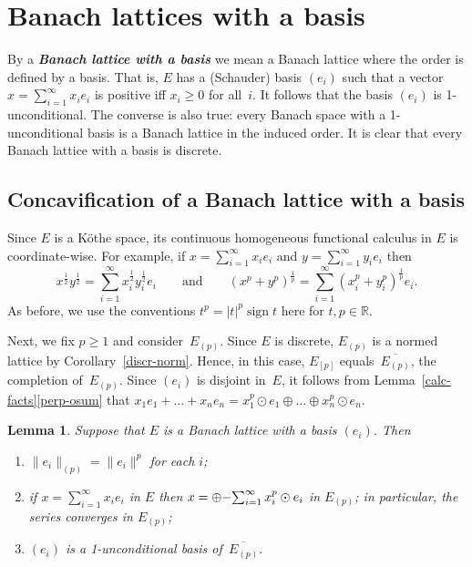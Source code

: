 \documentclass[12pt]{amsart}
\theoremstyle{plain}
\newtheorem{lemma}[theorem]{Lemma}
\theoremstyle{definition}
\newcommand{\abs}[1]{\lvert#1\rvert}
\newcommand{\norm}[1]{\lVert#1\rVert}
\renewcommand{\ge}{\geqslant}
\newcommand{\term}[1]{{\textit{\textbf{#1}}}}
\def\xyroot{x^{\frac{1}{2}}{y^{\frac{1}{2}}}}
\DeclareMathOperator{\sign}{sign}
\begin{document}
\section{Banach lattices with a basis}

By a \term{Banach lattice with a basis} we mean a Banach lattice where
the order is defined by a basis. That is, $E$ has a (Schauder) basis
$(e_i)$ such that a vector $x=\sum_{i=1}^\infty x_ie_i$ is positive iff
$x_i\ge 0$ for all~$i$.  It follows that the basis $(e_i)$ is
1-unconditional. The converse is also true: every Banach space with a
1-unconditional basis is a Banach lattice in the induced order. It is
clear that every Banach lattice with a basis is discrete.

\subsection{Concavification of a Banach lattice with a basis}

Since $E$ is a K\"othe space, its continuous homogeneous functional
calculus in $E$ is coordinate-wise. For example, if
$x=\sum_{i=1}^{\infty}x_ie_i$ and $y=\sum_{i=1}^{\infty}y_ie_i$ then
\begin{displaymath}
 \xyroot=
  \sum_{i=1}^{\infty}x_i^{\frac{1}{2}}y_i^{\frac{1}{2}}e_i
 \qquad\mbox{and}\qquad
 (x^p+y^p)^{\frac{1}{p}}=
  \sum_{i=1}^{\infty}(x_i^p+y_i^p)^{\frac{1}{p}}e_i. 
\end{displaymath}
As before, we use the conventions $t^p=\abs{t}^p\sign t$ here for
$t,p\in\mathbb R$. 

Next, we fix $p\ge 1$ and consider~$E_{(p)}$. Since $E$ is discrete,
$E_{(p)}$ is a normed lattice by Corollary~\ref{discr-norm}. Hence, in
this case, $E_{[p]}$ equals~$\overline{E_{(p)}}$, the completion
of~$E_{(p)}$. Since $(e_i)$ is disjoint in~$E$, it follows from
Lemma~\ref{calc-facts}\eqref{perp-osum} that
$x_1e_1+\dots+x_ne_n=x_1^p\odot e_1\oplus\dots\oplus x_n^p\odot e_n$.

\begin{lemma}\label{Ep-basis}
  Suppose that $E$ is a Banach lattice with a basis $(e_i)$. Then
  \begin{enumerate}
  \item\label{same-norm} $\norm{e_i}_{(p)}=\norm{e_i}^p$ for each $i$;
  \item\label{espans} if $x=\sum_{i=1}^\infty x_ie_i$ in $E$ then
    $x=\oplus{\rm -}\!\sum_{i=1}^\infty x_i^p\odot e_i$ in $E_{(p)}$; in
    particular, the series converges in $E_{(p)}$;
  \item\label{ei-basis-Ep} $(e_i)$ is a 1-unconditional basis of~$\overline{E_{(p)}}$.
  \end{enumerate}
\end{lemma}
\end{document}
